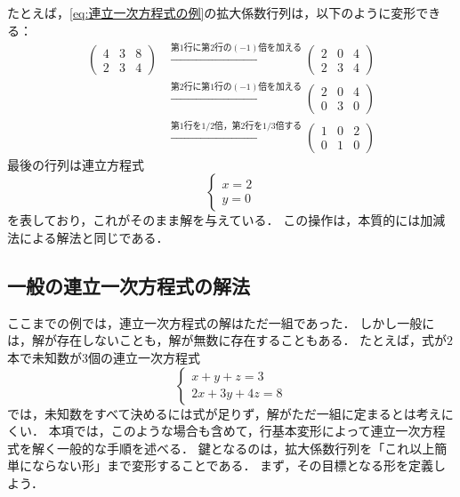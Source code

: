 たとえば，\eqref{eq:連立一次方程式の例}の拡大係数行列は，以下のように変形できる：
\begin{align*}
  \begin{pmatrix}
    4 & 3 & 8 \\
    2 & 3 & 4
  \end{pmatrix}
  &\xrightarrow{\text{第1行に第2行の$(-1)$倍を加える}}
  \begin{pmatrix}
    2 & 0 & 4 \\
    2 & 3 & 4
  \end{pmatrix} \\
  &\xrightarrow{\text{第2行に第1行の$(-1)$倍を加える}}
  \begin{pmatrix}
    2 & 0 & 4 \\
    0 & 3 & 0
  \end{pmatrix} \\
  &\xrightarrow{\text{第1行を$1/2$倍，第2行を$1/3$倍する}}
  \begin{pmatrix}
    1 & 0 & 2 \\
    0 & 1 & 0
  \end{pmatrix}
\end{align*}
最後の行列は連立方程式
\[
  \begin{cases}
    x = 2 \\
    y = 0
  \end{cases}
\]
を表しており，これがそのまま解を与えている．
この操作は，本質的には加減法による解法と同じである．

\subsection{一般の連立一次方程式の解法}

ここまでの例では，連立一次方程式の解はただ一組であった．
しかし一般には，解が存在しないことも，解が無数に存在することもある．
たとえば，式が$2$本で未知数が$3$個の連立一次方程式
\begin{equation}
  \begin{cases}
    x + y + z = 3 \\
    2x + 3y + 4z = 8
  \end{cases} \label{eq:不定な連立一次方程式}
\end{equation}
では，未知数をすべて決めるには式が足りず，解がただ一組に定まるとは考えにくい．
本項では，このような場合も含めて，行基本変形によって連立一次方程式を解く一般的な手順を述べる．
鍵となるのは，拡大係数行列を「これ以上簡単にならない形」まで変形することである．
まず，その目標となる形を定義しよう．


